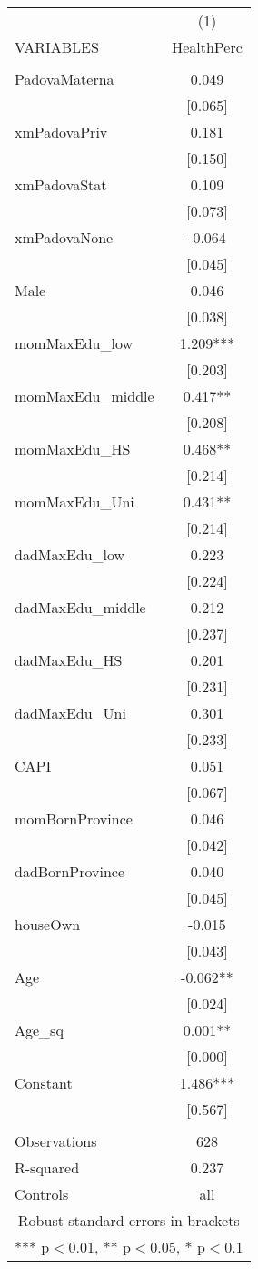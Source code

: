 \documentclass[]{article}
\begin{document}
\begin{tabular}{lc} \hline
 & (1) \\
VARIABLES & HealthPerc \\ \hline
 &  \\
PadovaMaterna & 0.049 \\
 & [0.065] \\
xmPadovaPriv & 0.181 \\
 & [0.150] \\
xmPadovaStat & 0.109 \\
 & [0.073] \\
xmPadovaNone & -0.064 \\
 & [0.045] \\
Male & 0.046 \\
 & [0.038] \\
momMaxEdu\_low & 1.209*** \\
 & [0.203] \\
momMaxEdu\_middle & 0.417** \\
 & [0.208] \\
momMaxEdu\_HS & 0.468** \\
 & [0.214] \\
momMaxEdu\_Uni & 0.431** \\
 & [0.214] \\
dadMaxEdu\_low & 0.223 \\
 & [0.224] \\
dadMaxEdu\_middle & 0.212 \\
 & [0.237] \\
dadMaxEdu\_HS & 0.201 \\
 & [0.231] \\
dadMaxEdu\_Uni & 0.301 \\
 & [0.233] \\
CAPI & 0.051 \\
 & [0.067] \\
momBornProvince & 0.046 \\
 & [0.042] \\
dadBornProvince & 0.040 \\
 & [0.045] \\
houseOwn & -0.015 \\
 & [0.043] \\
Age & -0.062** \\
 & [0.024] \\
Age\_sq & 0.001** \\
 & [0.000] \\
Constant & 1.486*** \\
 & [0.567] \\
 &  \\
Observations & 628 \\
R-squared & 0.237 \\
 Controls & all \\ \hline
\multicolumn{2}{c}{ Robust standard errors in brackets} \\
\multicolumn{2}{c}{ *** p$<$0.01, ** p$<$0.05, * p$<$0.1} \\
\end{tabular}
\end{document}

